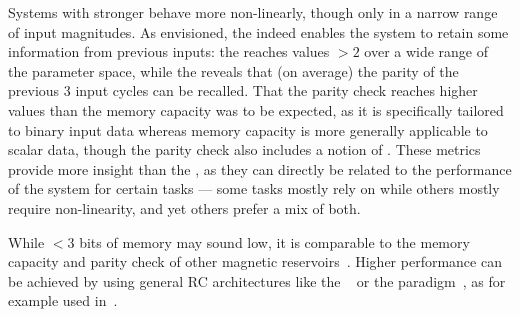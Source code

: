 Systems with stronger  behave more non-linearly, though only in a narrow range of input  magnitudes.
As envisioned, the  indeed enables the system to retain some information from previous inputs: the  reaches values $>2$ over a wide range of the parameter space, while the  reveals that (on average) the parity of the previous 3 input cycles can be recalled.
That the parity check reaches higher values than the memory capacity was to be expected, as it is specifically tailored to binary input data whereas memory capacity is more generally applicable to scalar data, though the parity check also includes a notion of .
These metrics provide more insight than the , as they can directly be related to the performance of the system for certain tasks --- some tasks mostly rely on  while others mostly require non-linearity, and yet others prefer a mix of both. \par
While $<3$ bits of memory may sound low, it is comparable to the memory capacity and parity check of other magnetic reservoirs~\cite{NeuromorphicFewShot,hon2021numerical,tsunegi2019STOforcedsyncRC,Venkat_2024,Vidamour_2022}. %
Higher performance can be achieved by using general RC architectures like the ~\cite{RotatingNeuronsRC} or the  paradigm~\cite{appeltant2011information}, as for example used in~.


